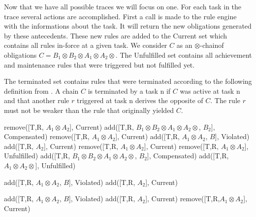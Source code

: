 \documentclass[10pt]{report}
\newcommand{\ochain}{$\otimes$-chain}
\begin{document}
Now that we have all possible traces we will focus on one. For each task in the trace several actions are accomplished. First a call is made to the rule engine with the informations about the task. It will return the new obligations generated by these antecedents. These new rules are added to the Current set which contains all rules in-force at a given task. We consider $C$ as an \ochain of obligations $C= B_{1} \otimes B_{2} \otimes A_{1} \otimes A_{2} \otimes$. The Unfulfilled set contains all achievement and maintenance rules that were triggered but not fulfilled yet.

The terminated set contains rules that were terminated according to the following definition from \autocite{ConceptuallyRichModelofBPC}. A chain $C$ is terminated by a task n if $C$ was active at task n and that another rule $r$ triggered at task n derives the opposite of $C$. The rule $r$ must not be weaker than the rule that originally yielded $C$.

\begin{algorithmic}
			\State remove([T,R, $A_{1} \otimes A_{2}$], Current)
				\State add([T,R, $B_{1} \otimes B_{2} \otimes A_{1} \otimes A_{2} \otimes$, $B_{2}]$, Compensated)
			\EndIf
		\Else 
			\State remove([T,R, $A_{1} \otimes A_{2} $], Current)
			\State add([T,R, $A_{1} \otimes A_{2}$, $B$], Violated)
			\State add([T,R, $A_{2}$], Current)
		\EndIf
	\EndIf
			\State remove([T,R, $A_{1} \otimes A_{2}$], Current)
			\State remove([T,R, $A_{1} \otimes A_{2}$], Unfulfilled)
				\State add([T,R, $B_{1} \otimes B_{2} \otimes A_{1} \otimes A_{2} \otimes$, $B_{2}]$, Compensated)
			\EndIf
		\Else
			\State add([T,R, $A_{1} \otimes A_{2} \otimes$], Unfulfilled)
		\EndIf
	\EndIf
	
			\State add([T,R, $A_{1} \otimes A_{2}$, $B$], Violated)
			\State add([T,R, $A_{2}$], Current)
		\EndIf
	\EndIf
\EndFor

\State

		\State add([T,R, $A_{1} \otimes A_{2}$, $B$], Violated)
		\State add([T,R, $A_{2}$], Current)
	\EndIf
		\State remove([T,R,$A_{1} \otimes A_{2}$], Current)
	\EndIf
\EndFor
\end{algorithmic}
\end{document}
